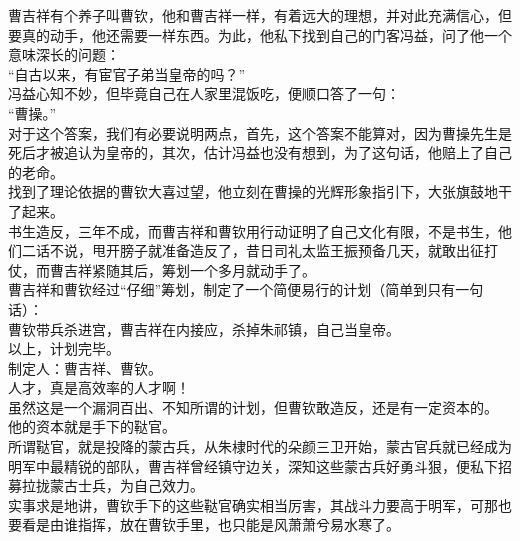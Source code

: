 \begin{multicols}{\theparacolNo}
曹吉祥有个养子叫曹钦，他和曹吉祥一样，有着远大的理想，并对此充满信心，但要真的动手，他还需要一样东西。为此，他私下找到自己的门客冯益，问了他一个意味深长的问题：\\

“自古以来，有宦官子弟当皇帝的吗？”\\

冯益心知不妙，但毕竟自己在人家里混饭吃，便顺口答了一句：\\

“曹操。”\\

对于这个答案，我们有必要说明两点，首先，这个答案不能算对，因为曹操先生是死后才被追认为皇帝的，其次，估计冯益也没有想到，为了这句话，他赔上了自己的老命。\\

找到了理论依据的曹钦大喜过望，他立刻在曹操的光辉形象指引下，大张旗鼓地干了起来。\\

书生造反，三年不成，而曹吉祥和曹钦用行动证明了自己文化有限，不是书生，他们二话不说，甩开膀子就准备造反了，昔日司礼太监王振预备几天，就敢出征打仗，而曹吉祥紧随其后，筹划一个多月就动手了。\\

曹吉祥和曹钦经过“仔细”筹划，制定了一个简便易行的计划（简单到只有一句话）：\\

曹钦带兵杀进宫，曹吉祥在内接应，杀掉朱祁镇，自己当皇帝。\\

以上，计划完毕。\\

制定人：曹吉祥、曹钦。\\

人才，真是高效率的人才啊！\\

虽然这是一个漏洞百出、不知所谓的计划，但曹钦敢造反，还是有一定资本的。\\

他的资本就是手下的鞑官。\\

所谓鞑官，就是投降的蒙古兵，从朱棣时代的朵颜三卫开始，蒙古官兵就已经成为明军中最精锐的部队，曹吉祥曾经镇守边关，深知这些蒙古兵好勇斗狠，便私下招募拉拢蒙古士兵，为自己效力。\\

实事求是地讲，曹钦手下的这些鞑官确实相当厉害，其战斗力要高于明军，可那也要看是由谁指挥，放在曹钦手里，也只能是风萧萧兮易水寒了。\\


\end{multicols}
